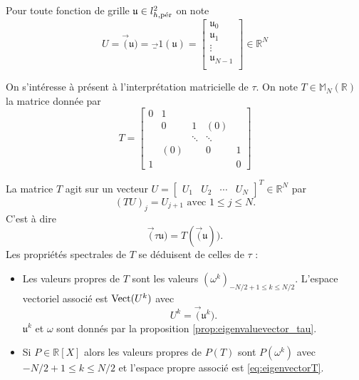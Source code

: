Pour toute fonction de grille $\mathfrak{u} \in l^2_{h,\per}$ on note
\begin{equation}
U = \vec( \mathfrak{u} ) = \vec_1( \mathfrak{u} ) = \begin{bmatrix}
\mathfrak{u}_0\\
\mathfrak{u}_1\\
\vdots\\
\mathfrak{u}_{N-1}\\
\end{bmatrix} \in \mathbb{R}^N
\end{equation}

On s'intéresse à présent à l'interprétation matricielle de $\tau$. On note $T \in \mathbb{M}_N (\mathbb{R})$ la matrice donnée par
\begin{equation}
T = \begin{bmatrix}
0 & 1 &   &   &   \\ 
  & 0 & 1 & (0) &   \\ 
  &   & \ddots & \ddots &   \\ 
  & (0) &   & 0 & 1 \\ 
1 &   &   &   & 0
\end{bmatrix} 
\label{eq:matrice_translation}
\end{equation}

La matrice $T$ agit sur un vecteur $U = \begin{bmatrix}
U_1 & U_2 & \cdots & U_{N} 
\end{bmatrix}^T \in \mathbb{R}^N $ par
\begin{equation}
(TU)_j = U_{j+1} \text{ avec } 1 \leq j \leq N.
\end{equation}
C'est à dire
\begin{equation}
\vec ( \tau \mathfrak{u} ) = T ( \vec ( \mathfrak{u} ) ). 
\end{equation}
Les propriétés spectrales de $T$ se déduisent de celles de $\tau$ :
\begin{corollaire}
\label{cor:eigen_P(T)}
\begin{itemize}
\item Les valeurs propres de $T$ sont les valeurs $(\omega^k)_{-N/2+1 \leq k \leq N/2}$. 
L'espace vectoriel associé est $\Vect ( U^k )$ avec
\begin{equation}
U^k = \vec (\mathfrak{u}^k ).
\label{eq:eigenvectorT}
\end{equation}
$\mathfrak{u}^k$ et $\omega$ sont donnés par la proposition \ref{prop:eigenvaluevector_tau}.

\item Si $P \in \mathbb{R}[X]$ alors les valeurs propres de $P(T)$ sont $P(\omega^k)$ avec $-N/2 + 1 \leq k \leq N/2$ et l'espace propre associé est \eqref{eq:eigenvectorT}.
\end{itemize}
\end{corollaire}

